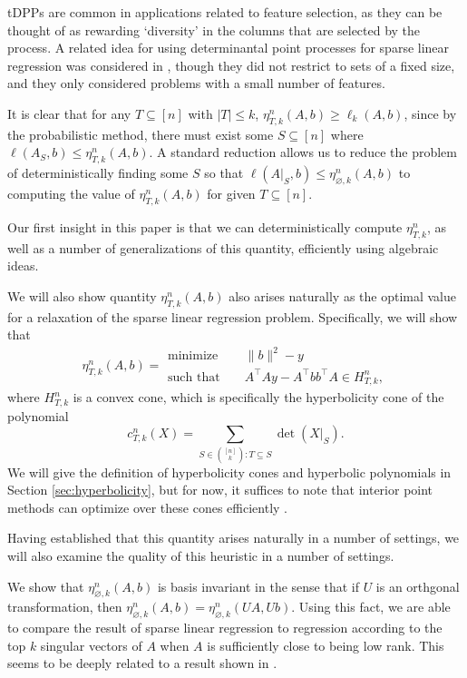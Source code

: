 \documentclass{amsart}
\theoremstyle{definition}
\numberwithin{equation}{section}
\begin{document}
tDPPs are common in applications related to feature selection, as they can be thought of as rewarding `diversity' in the columns that are selected by the process\cite{belhadji2018determinantal}.
A related idea for using determinantal point processes for sparse linear regression was considered in \cite{mutsuki2022deter}, though they did not restrict to sets of a fixed size, and they only considered problems with a small number of features.

It is clear that for any $T \subseteq [n]$ with $|T| \le k$, $\eta_{T, k}^n(A,b) \ge \ell_k(A,b)$, since by the probabilistic method, there must exist some $S \subseteq [n]$ where $\ell(A_S, b) \le \eta_{T, k}^n(A,b)$.
A standard reduction allows us to reduce the problem of deterministically finding some $S$ so that $\ell(A|_S, b) \le \eta_{\varnothing, k}^n(A, b)$ to computing the value of $ \eta_{T, k}^n(A, b)$ for given $T \subseteq [n]$.

Our first insight in this paper is that we can deterministically compute $\eta_{T,k}^n$, as well as a number of generalizations of this quantity, efficiently using algebraic ideas.

We will also show quantity $\eta_{T, k}^n(A, b)$ also arises naturally as the optimal value for a relaxation of the sparse linear regression problem.
Specifically, we will show that 
\begin{equation*}
    \eta_{T, k}^n(A,b) =
\begin{aligned}
    \text{minimize} &&\|b\|^2 - y\\
    \text{such that } &&A^{\intercal}Ay - A^{\intercal}bb^{\intercal}A \in H_{T, k}^n,
\end{aligned}
\end{equation*}
where $H_{T, k}^n$ is a convex cone, which is specifically the hyperbolicity cone of the polynomial 
\[
    c_{T, k}^n(X) = \sum_{S \in \binom{[n]}{k} : T \subseteq S} \det(X|_S).
\]
We will give the definition of hyperbolicity cones and hyperbolic polynomials in Section \ref{sec:hyperbolicity}, but for now, it suffices to note that interior point methods can optimize over these cones efficiently \cite{guler1997hyperbolic}.

Having established that this quantity arises naturally in a number of settings, we will also examine the quality of this heuristic in a number of settings.

We show that $\eta_{\varnothing, k}^n(A,b)$ is basis invariant in the sense that if $U$ is an orthgonal transformation, then $\eta_{\varnothing, k}^n(A,b) = \eta_{\varnothing, k}^n(UA,Ub)$.
Using this fact, we are able to compare the result of sparse linear regression to regression according to the top $k$ singular vectors of $A$ when $A$ is sufficiently close to being low rank.
This seems to be deeply related to a result shown in \cite{belhadji2018determinantal}. %
\end{document}
